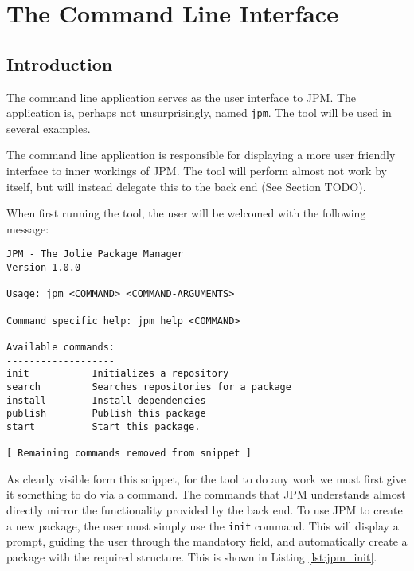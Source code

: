 
\section{The Command Line Interface}

%

\subsection{Introduction}

The command line application serves as the user interface to JPM. The
application is, perhaps not unsurprisingly, named \texttt{jpm}. The
tool will be used in several examples.

The command line application is responsible for displaying a more user friendly
interface to inner workings of JPM. The tool will perform almost not work by
itself, but will instead delegate this to the back end (See Section TODO).

When first running the tool, the user will be welcomed with the following
message:

\begin{verbatim}
JPM - The Jolie Package Manager
Version 1.0.0

Usage: jpm <COMMAND> <COMMAND-ARGUMENTS>

Command specific help: jpm help <COMMAND>

Available commands:
-------------------
init           Initializes a repository
search         Searches repositories for a package
install        Install dependencies
publish        Publish this package
start          Start this package.

[ Remaining commands removed from snippet ]
\end{verbatim}

As clearly visible form this snippet, for the tool to do any work we must first
give it something to do via a command. The commands that JPM understands almost
directly mirror the functionality provided by the back end. To use JPM to
create a new package, the user must simply use the \texttt{init}
command. This will display a prompt, guiding the user through the mandatory
field, and automatically create a package with the required structure. This
is shown in Listing \ref{lst:jpm_init}.


